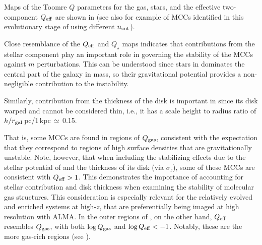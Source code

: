 \IfFileExists{emulateapjlegacy.cls}{\documentclass[iop]{emulateapjlegacy}}{\documentclass[iop]{emulateapj}}
\begin{document}
Maps of the Toomre $Q$ parameters for the gas, stars, and the effective two-component $Q_{\rm eff}$ are shown in 
(see also  for example of MCCs identified in this evolutionary stage of \flower
using different $n_{\rm cut}$). 

Close resemblance of the $Q_{\rm eff}$ and $Q_{\star}$ maps indicates that contributions from the stellar component play an important role in governing the stability of the MCCs against $m$ perturbations. This can be understood since stars in \flower dominates the central part of the galaxy in mass, so their gravitational potential provides a non-negligible contribution to the instability.

Similarly, contribution from the thickness of the disk is important in \flower since its disk warped and cannot be considered thin, i.e., 
it has a scale height to radius ratio of $h/r_{\rm gal}$\,pc/1\,kpc\,$\simeq$\,0.15.

That is, some MCCs are found in regions of $Q_{\rm gas}$, consistent with the expectation that they correspond to regions of high surface densities that are gravitationally unstable. 
Note, however, that when including the stabilizing effects due to the stellar potential of \flower and the
thickness of its disk (via $\sigma_z$), some of these MCCs are consistent with  $Q_{\rm eff} > 1$. 
This demonstrates the importance of accounting for stellar contribution and disk thickness 
when examining the stability of molecular gas structures.
This consideration is especially relevant for the relatively evolved and enriched systems at high-$z$, 
that are preferentially being imaged at high resolution with ALMA.
In the outer regions of \flower, on the other hand, $Q_{\rm eff}$ resembles $Q_{\rm gas}$, with 
both $\log{Q_{\rm gas}}$ and $\log{Q_{\rm eff}} < -1$. 
Notably, these are the more gas-rich regions (see ).
\end{document}
